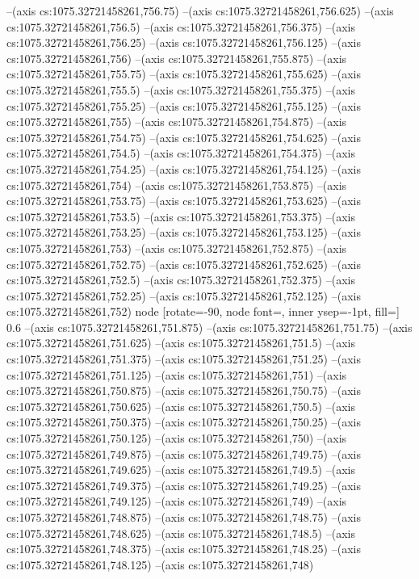 --(axis cs:1075.32721458261,756.75)
--(axis cs:1075.32721458261,756.625)
--(axis cs:1075.32721458261,756.5)
--(axis cs:1075.32721458261,756.375)
--(axis cs:1075.32721458261,756.25)
--(axis cs:1075.32721458261,756.125)
--(axis cs:1075.32721458261,756)
--(axis cs:1075.32721458261,755.875)
--(axis cs:1075.32721458261,755.75)
--(axis cs:1075.32721458261,755.625)
--(axis cs:1075.32721458261,755.5)
--(axis cs:1075.32721458261,755.375)
--(axis cs:1075.32721458261,755.25)
--(axis cs:1075.32721458261,755.125)
--(axis cs:1075.32721458261,755)
--(axis cs:1075.32721458261,754.875)
--(axis cs:1075.32721458261,754.75)
--(axis cs:1075.32721458261,754.625)
--(axis cs:1075.32721458261,754.5)
--(axis cs:1075.32721458261,754.375)
--(axis cs:1075.32721458261,754.25)
--(axis cs:1075.32721458261,754.125)
--(axis cs:1075.32721458261,754)
--(axis cs:1075.32721458261,753.875)
--(axis cs:1075.32721458261,753.75)
--(axis cs:1075.32721458261,753.625)
--(axis cs:1075.32721458261,753.5)
--(axis cs:1075.32721458261,753.375)
--(axis cs:1075.32721458261,753.25)
--(axis cs:1075.32721458261,753.125)
--(axis cs:1075.32721458261,753)
--(axis cs:1075.32721458261,752.875)
--(axis cs:1075.32721458261,752.75)
--(axis cs:1075.32721458261,752.625)
--(axis cs:1075.32721458261,752.5)
--(axis cs:1075.32721458261,752.375)
--(axis cs:1075.32721458261,752.25)
--(axis cs:1075.32721458261,752.125)
--(axis cs:1075.32721458261,752)
node [rotate=-90, node font=\tiny, inner ysep=-1pt, fill=\bgcol] {0.6}
--(axis cs:1075.32721458261,751.875)
--(axis cs:1075.32721458261,751.75)
--(axis cs:1075.32721458261,751.625)
--(axis cs:1075.32721458261,751.5)
--(axis cs:1075.32721458261,751.375)
--(axis cs:1075.32721458261,751.25)
--(axis cs:1075.32721458261,751.125)
--(axis cs:1075.32721458261,751)
--(axis cs:1075.32721458261,750.875)
--(axis cs:1075.32721458261,750.75)
--(axis cs:1075.32721458261,750.625)
--(axis cs:1075.32721458261,750.5)
--(axis cs:1075.32721458261,750.375)
--(axis cs:1075.32721458261,750.25)
--(axis cs:1075.32721458261,750.125)
--(axis cs:1075.32721458261,750)
--(axis cs:1075.32721458261,749.875)
--(axis cs:1075.32721458261,749.75)
--(axis cs:1075.32721458261,749.625)
--(axis cs:1075.32721458261,749.5)
--(axis cs:1075.32721458261,749.375)
--(axis cs:1075.32721458261,749.25)
--(axis cs:1075.32721458261,749.125)
--(axis cs:1075.32721458261,749)
--(axis cs:1075.32721458261,748.875)
--(axis cs:1075.32721458261,748.75)
--(axis cs:1075.32721458261,748.625)
--(axis cs:1075.32721458261,748.5)
--(axis cs:1075.32721458261,748.375)
--(axis cs:1075.32721458261,748.25)
--(axis cs:1075.32721458261,748.125)
--(axis cs:1075.32721458261,748)

